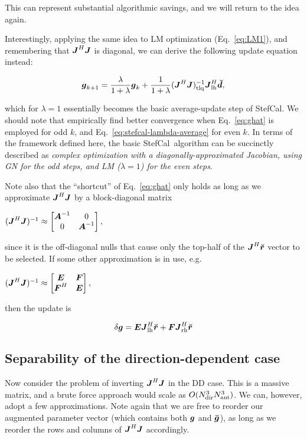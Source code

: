 \documentclass[useAMS,usenatbib]{mn2e}
\newcommand{\vecg}{\bmath{g}}
\newcommand{\mat}[1]{{\bmath{#1}}}
\newcommand{\JJ}{\mat{J}} %
\newcommand{\JHJ}{\JJ^H\JJ} %
\newcommand{\StefCal}{{\sc StefCal}}
\begin{document}
This can represent substantial algorithmic savings, and we will return to the idea again.

Interestingly, applying the same idea to LM optimization (Eq.~\ref{eq:LM1}), and remembering that $\JHJ$ is 
diagonal, we can derive the following update equation instead:

\begin{equation}
\bmath{g}_{k+1} = \frac{\lambda}{1+\lambda}\bmath{g}_k + \frac{1}{1+\lambda} (\JHJ)_\UL^{-1} \JJ_\LEFT^H \Dd,
\label{eq:stefcal-lambda-average}
\end{equation}

which for $\lambda=1$ essentially becomes the basic average-update step of \StefCal. We should note that \citet{Stefcal} empirically 
find better convergence when Eq.~\ref{eq:ghat} is employed for odd $k$, and Eq.~\ref{eq:stefcal-lambda-average} for even $k$.
In terms of the framework defined here, the basic \StefCal\ algorithm can be succinctly described as {\em complex optimization with a 
diagonally-approximated Jacobian, using GN for the odd steps, and LM ($\lambda=1$) for the even steps}.


Note also that the ``shortcut'' of Eq.~\ref{eq:ghat} only holds as long as we approximate $\JHJ$ by a block-diagonal matrix

$
 (\JHJ)^{-1} \approx \Matrix{cc}{\bmath{A}^{-1}&0\\0&\bmath{A}^{-1}},
$

since it is the off-diagonal nulls that cause only the top-half of the $\JJ^H \Rr$ vector to be selected. If some other 
approximation is in use, e.g.

$
 (\JHJ)^{-1} \approx \Matrix{cc}{\bmath{E} & \bmath{F} \\ \bmath{F}^H & \bmath{E}},
$

then the update is

\[
\delta \vecg = \bmath{E} \JJ_\LEFT^H \Rr +  \bmath{F} \JJ_\RIGHT^H \Rr
\]



\subsection{Separability of the direction-dependent case}

Now consider the problem of inverting $\JHJ$ in the DD case. This is a massive matrix, and a brute force 
approach would scale as $O(N_\mathrm{dir}^3N_\mathrm{ant}^3)$. We can, however, adopt a few approximations. Note again that we are 
free to reorder our augmented parameter vector (which contains both $\bmath{g}$ and $\bmath{\bar g}$), 
as long as we reorder the rows and columns of $\JHJ$ accordingly.
\end{document}
